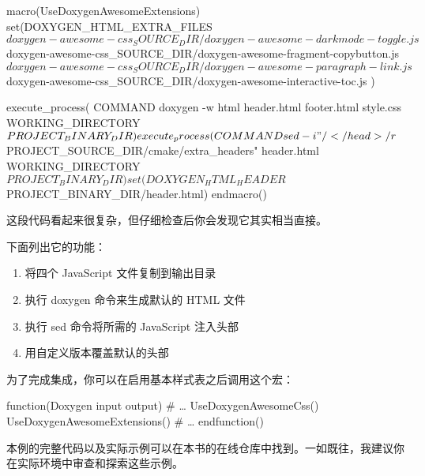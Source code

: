 
\begin{cmake}
macro(UseDoxygenAwesomeExtensions)
    set(DOXYGEN_HTML_EXTRA_FILES
        ${doxygen-awesome-css_SOURCE_DIR}/doxygen-awesome-darkmode-toggle.js
        ${doxygen-awesome-css_SOURCE_DIR}/doxygen-awesome-fragment-copybutton.js
        ${doxygen-awesome-css_SOURCE_DIR}/doxygen-awesome-paragraph-link.js
        ${doxygen-awesome-css_SOURCE_DIR}/doxygen-awesome-interactive-toc.js
    )

    execute_process(
        COMMAND doxygen -w html header.html footer.html style.css
        WORKING_DIRECTORY ${PROJECT_BINARY_DIR}
    )
    execute_process(
        COMMAND sed -i
        "/<\\/head>/r ${PROJECT_SOURCE_DIR}/cmake/extra_headers"
        header.html
        WORKING_DIRECTORY ${PROJECT_BINARY_DIR}
    )
    set(DOXYGEN_HTML_HEADER ${PROJECT_BINARY_DIR}/header.html)
endmacro()
\end{cmake}

这段代码看起来很复杂，但仔细检查后你会发现它其实相当直接。

下面列出它的功能：

\begin{enumerate}
\item
将四个 JavaScript 文件复制到输出目录

\item
执行 doxygen 命令来生成默认的 HTML 文件

\item
执行 sed 命令将所需的 JavaScript 注入头部

\item
用自定义版本覆盖默认的头部
\end{enumerate}

为了完成集成，你可以在启用基本样式表之后调用这个宏：


\begin{cmake}
function(Doxygen input output)
# …
    UseDoxygenAwesomeCss()
    UseDoxygenAwesomeExtensions()
# …
endfunction()
\end{cmake}

本例的完整代码以及实际示例可以在本书的在线仓库中找到。一如既往，我建议你在实际环境中审查和探索这些示例。


